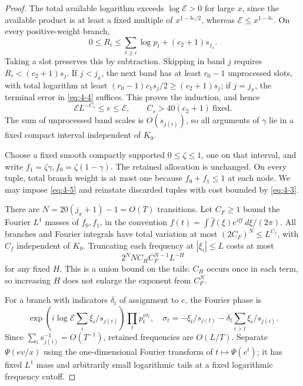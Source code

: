 \documentclass[11pt]{article}
\theoremstyle{definition}
\theoremstyle{definition}
\begin{document}
\begin{proof}
The total available logarithm exceeds \(\log\mathcal E>0\) for large \(x\), since the available product is at least a fixed multiple of \(x^{1-b_*/2}\), whereas \(\mathcal E\le x^{1-b_*}\). On every positive-weight branch,
\begin{equation}
0\le R_i\le\sum_{t\ge i}\log p_t+(c_2+1)s_{j_x}.        \tag{4.4}\label{eq:4-4}
\end{equation}
Taking a slot preserves this by subtraction. Skipping in band \(j\) requires \(R_i<(c_2+1)s_j\). If \(j<j_x\), the next band has at least \(r_0-1\) unprocessed slots, with total logarithm at least
\((r_0-1)c_1s_j/2\ge(c_2+1)s_j\); if \(j=j_x\), the terminal error in \eqref{eq:4-4} suffices. This proves the induction, and hence
\begin{equation}
\mathcal E L^{-C_s}\le e\le\mathcal E,\qquad
 C_s>40(c_2+1)\ \text{fixed}.                            \tag{4.5}\label{eq:4-5}
\end{equation}
The sum of unprocessed band scales is \(O(s_{j(i)})\), so all arguments of \(\gamma\) lie in a fixed compact interval independent of \(K_0\).

Choose a fixed smooth compactly supported \(0\le\zeta\le1\), one on that interval, and write \(f_1=\zeta\gamma,f_0=\zeta(1-\gamma)\). The retained allocation is unchanged. On every tuple, total branch weight is at most one because \(f_0+f_1\le1\) at each node. We may impose \eqref{eq:4-5} and reinstate discarded tuples with cost bounded by \eqref{eq:4-3}.

There are \(N=20(j_x+1)-1=O(T)\) transitions. Let \(C_F\ge1\) bound the Fourier \(L^1\) masses of \(f_0,f_1\), in the convention \(f(t)=\int\widehat f(\xi)e^{i\xi t}\,d\xi/(2\pi)\). All branches and Fourier integrals have total variation at most \((2C_F)^N\le L^{C_f}\), with \(C_f\) independent of \(K_0\). Truncating each frequency at \(|\xi_i|\le L\) costs at most
\begin{equation}
2^NN C_H C_F^{N-1}L^{-H}                               \tag{4.6}\label{eq:4-6}
\end{equation}
for any fixed \(H\). This is a union bound on the tails: \(C_H\) occurs once in each term, so increasing \(H\) does not enlarge the exponent from \(C_F^N\).

For a branch with indicators \(\delta_t\) of assignment to \(e\), the Fourier phase is
\begin{equation*}
\exp\!\left(i\log\mathcal E\sum_i\xi_i/s_{j(i)}\right)
 \prod_t p_t^{i\sigma_t},\quad
 \sigma_t=-\xi_t/s_{j(t)}
              -\delta_t\sum_{i>t}\xi_i/s_{j(i)} .
\end{equation*}
Since \(\sum_i s_{j(i)}^{-1}=O(T^{-1})\), retained frequencies are \(O(L/T)\). Separate \(\Psi(ev/x)\) using the one-dimensional Fourier transform of \(t\mapsto\Psi(e^t)\); it has fixed \(L^1\) mass and arbitrarily small logarithmic tails at a fixed logarithmic frequency cutoff.


\end{proof}
\end{document}
